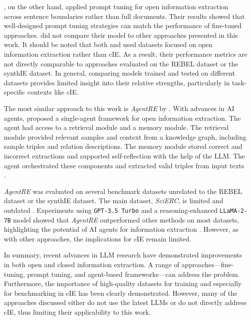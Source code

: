 \documentclass[a4paper,oneside,bibliography=totoc]{scrbook}
\begin{document}
\citet{Chen2024}, on the other hand, applied prompt tuning for open information extraction across sentence boundaries rather than full documents. Their results showed that well-designed prompt tuning strategies can match the performance of fine-tuned approaches. \citet{Chen2024} did not compare their model to other approaches presented in this work. It should be noted that both \citet{Chen2024} and \citet{Xue2024} used datasets focused on open information extraction rather than \ac{cIE}. As a result, their performance metrics are not directly comparable to approaches evaluated on the REBEL dataset or the synthIE dataset. In general, comparing models trained and tested on different datasets provides limited insight into their relative strengths, particularly in task-specific contexts like \ac{cIE}.

The most similar approach to this work is \textit{AgentRE} by \citet{Shi2024}. With advances in AI agents, \citet{Shi2024} proposed a single-agent framework for open information extraction. The agent had access to a retrieval module and a memory module. The retrieval module provided relevant samples and context from a knowledge graph, including sample triples and relation descriptions. The memory module stored correct and incorrect extractions and supported self-reflection with the help of the \ac{LLM}. The agent orchestrated these components and extracted valid triples from input texts \cite{Shi2024}.

\textit{AgentRE} was evaluated on several benchmark datasets unrelated to the REBEL dataset or the synthIE dataset. The main dataset, \textit{SciERC}, is limited and outdated \cite{Luan2018}. Experiments using \texttt{GPT-3.5 Turbo} and a reasoning-enhanced \texttt{LLaMA-2-7B} model showed that \textit{AgentRE} outperformed other methods on most datasets, highlighting the potential of AI agents for information extraction \cite{Shi2024}. However, as with other approaches, the implications for \ac{cIE} remain limited.

In summary, recent advances in \ac{LLM} research have demonstrated improvements in both open and closed information extraction. A range of approaches—fine-tuning, prompt tuning, and agent-based frameworks—can address the problem. Furthermore, the importance of high-quality datasets for training and especially for benchmarking in \ac{cIE} has been clearly demonstrated. However, many of the approaches discussed either do not use the latest \acp{LLM} or do not directly address \ac{cIE}, thus limiting their applicability to this work.
\end{document}

